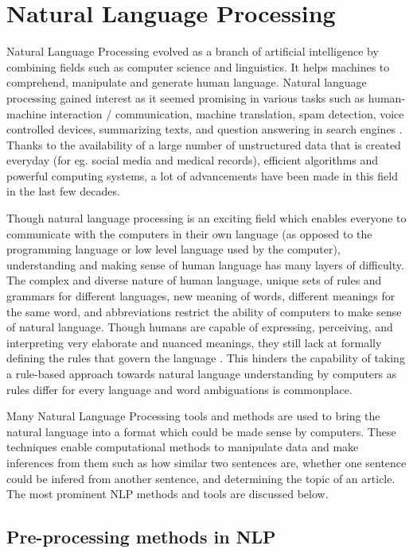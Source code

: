 
\chapter{Natural Language Processing}

Natural Language Processing evolved as a branch of artificial intelligence by combining fields such as computer science and linguistics. It helps machines to comprehend, manipulate and generate human language. Natural language processing gained interest as it seemed promising in various tasks such as human-machine interaction / communication, machine translation, spam detection, voice controlled devices, summarizing texts, and question answering in search engines \cite{nlp_appli}. Thanks to the availability of a large number of unstructured data that is created everyday (for eg. social media and medical records), efficient algorithms and powerful computing systems, a lot of advancements have been made in this field in the last few decades. 

Though natural language processing is an exciting field which enables everyone to communicate with the computers in their own language (as opposed to the programming language or low level language used by the computer), understanding and making sense of human language has many layers of difficulty. The complex and diverse nature of human language, unique sets of rules and grammars for different languages, new meaning of words, different meanings for the same word, and abbreviations restrict the ability of computers to make sense of natural language. Though humans are capable of expressing, perceiving, and interpreting very elaborate and nuanced meanings, they still lack at formally defining the rules that govern the language \cite{goldberg2017neural}. This hinders the capability of taking a rule-based approach towards natural language understanding by computers as rules differ for every language and word ambiguations is commonplace. 

Many Natural Language Processing tools and methods are used to bring the natural language into a format which could be made sense by computers. These techniques enable computational methods to manipulate data and make inferences from them such as how similar two sentences are, whether one sentence could be infered from another sentence, and determining the topic of an article. The most prominent NLP methods and tools are discussed below. 

\section{Pre-processing methods in NLP}

